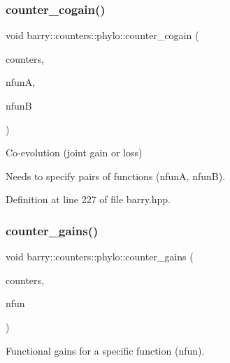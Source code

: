 \subsubsection{\texorpdfstring{counter\+\_\+cogain()}{counter\_cogain()}}
{\footnotesize\ttfamily void barry\+::counters\+::phylo\+::counter\+\_\+cogain (\begin{DoxyParamCaption}\item[{\hyperlink{namespacebarry_1_1counters_1_1phylo_a2f117d1cd1dff67e1539cbc0aef5766a}{Phylo\+Counter\+Vector} $\ast$}]{counters,  }\item[{\hyperlink{namespacebarry_a11dfc53ddb4672278319aa04f1e09a6c}{uint}}]{nfunA,  }\item[{\hyperlink{namespacebarry_a11dfc53ddb4672278319aa04f1e09a6c}{uint}}]{nfunB }\end{DoxyParamCaption})\hspace{0.3cm}{\ttfamily [inline]}}



Co-\/evolution (joint gain or loss) 

Needs to specify pairs of functions ({\ttfamily nfunA}, {\ttfamily nfunB}). 

Definition at line 227 of file barry.\+hpp.

\mbox{\label{namespacebarry_1_1counters_1_1phylo_ab040401fb8219f9023c9bfec80a4c78a}} 
\subsubsection{\texorpdfstring{counter\+\_\+gains()}{counter\_gains()}}
{\footnotesize\ttfamily void barry\+::counters\+::phylo\+::counter\+\_\+gains (\begin{DoxyParamCaption}\item[{\hyperlink{namespacebarry_1_1counters_1_1phylo_a2f117d1cd1dff67e1539cbc0aef5766a}{Phylo\+Counter\+Vector} $\ast$}]{counters,  }\item[{std\+::vector$<$ \hyperlink{namespacebarry_a11dfc53ddb4672278319aa04f1e09a6c}{uint} $>$}]{nfun }\end{DoxyParamCaption})\hspace{0.3cm}{\ttfamily [inline]}}



Functional gains for a specific function ({\ttfamily nfun}). 



